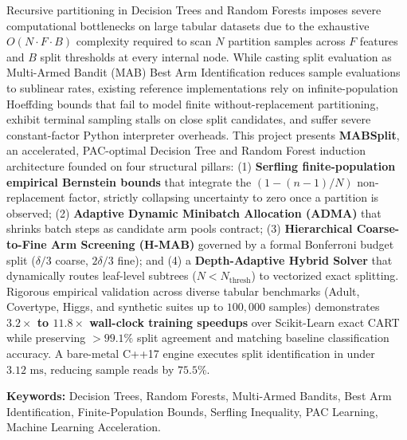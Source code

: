 \documentclass{article}
\begin{document}
	\noindent
	Recursive partitioning in Decision Trees and Random Forests imposes severe computational bottlenecks on large tabular datasets due to the exhaustive $O(N \cdot F \cdot B)$ complexity required to scan $N$ partition samples across $F$ features and $B$ split thresholds at every internal node. While casting split evaluation as Multi-Armed Bandit (MAB) Best Arm Identification reduces sample evaluations to sublinear rates, existing reference implementations rely on infinite-population Hoeffding bounds that fail to model finite without-replacement partitioning, exhibit terminal sampling stalls on close split candidates, and suffer severe constant-factor Python interpreter overheads. This project presents \textbf{MABSplit}, an accelerated, PAC-optimal Decision Tree and Random Forest induction architecture founded on four structural pillars: (1) \textbf{Serfling finite-population empirical Bernstein bounds} that integrate the $(1 - (n-1)/N)$ non-replacement factor, strictly collapsing uncertainty to zero once a partition is observed; (2) \textbf{Adaptive Dynamic Minibatch Allocation (ADMA)} that shrinks batch steps as candidate arm pools contract; (3) \textbf{Hierarchical Coarse-to-Fine Arm Screening (H-MAB)} governed by a formal Bonferroni budget split ($\delta/3$ coarse, $2\delta/3$ fine); and (4) a \textbf{Depth-Adaptive Hybrid Solver} that dynamically routes leaf-level subtrees ($N < N_{\text{thresh}}$) to vectorized exact splitting. Rigorous empirical validation across diverse tabular benchmarks (Adult, Covertype, Higgs, and synthetic suites up to $100{,}000$ samples) demonstrates \textbf{$3.2\times$ to $11.8\times$ wall-clock training speedups} over Scikit-Learn exact CART while preserving $>99.1\%$ split agreement and matching baseline classification accuracy. A bare-metal C++17 engine executes split identification in under $3.12\text{ ms}$, reducing sample reads by $75.5\%$.
	
	\vspace{0.8cm}
	\noindent
	\textbf{Keywords:} Decision Trees, Random Forests, Multi-Armed Bandits, Best Arm Identification, Finite-Population Bounds, Serfling Inequality, PAC Learning, Machine Learning Acceleration.

	\pagebreak
	
	\renewcommand{\contentsname}{\textbf{\color{blue}Table Of Contents}}
	\renewcommand{\cfttoctitlefont}{\huge}
	\tableofcontents
	\thispagestyle{fancy}
	
	\clearpage
\end{document}
